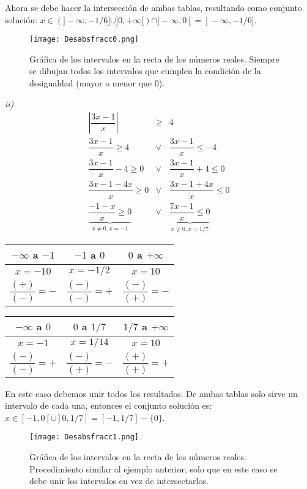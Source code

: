 Ahora se debe hacer la intersección de ambas tablas, resultando como conjunto solución: $x\in \left( ]-\infty,-1/6]\cup ]0,+\infty[\right) \cap ]-\infty,0[=]-\infty,-1/6]$.\\
\begin{center}
\begin{figure}[h!]
\centering
\texttt{[image: Desabsfracc0.png]}
\caption[Gráfica de los intervalos en la recta de los números reales.]{Gráfica de los intervalos en la recta de los números reales. Siempre se dibujan todos los  intervalos que cumplen la condición de la desigualdad (mayor o menor que 0).}
\end{figure}
\end{center}
\noindent\textit{ii)}\\
\begin{eqnarray*}
\left|\dfrac{3x-1}{x}\right| &\geq &4  \\
\dfrac{3x-1}{x}\geq 4 &\vee & \dfrac{3x-1}{x}\leq -4\\
\dfrac{3x-1}{x}-4\geq 0 &\vee & \dfrac{3x-1}{x}+4\leq 0\\
\dfrac{3x-1-4x}{x}\geq 0 &\vee & \dfrac{3x-1+4x}{x}\leq 0\\
\underbrace{\dfrac{-1-x}{x}\geq 0}_{x\neq 0, x=-1} &\vee & \underbrace{\dfrac{7x-1}{x}\leq 0}_{x\neq 0, x=1/7}
\end{eqnarray*}

\begin{minipage}{0.5\textwidth}
\begin{tabular}{|c|c|c|}
\hline
  $-\infty$ a $-1$ & $-1$ a $0$ & $0$ a $+\infty$ \\
\hline
 $x=-10$ & $x=-1/2$ & $x=10$  \\
  $\dfrac{(+)}{(-)}=-$&$\dfrac{(-)}{(-)}=+$&$\dfrac{(-)}{(+)}=-$\\
\hline
\end{tabular}
\end{minipage}
\begin{minipage}{0.5\textwidth}
\begin{tabular}{|c|c|c|}
\hline
 $-\infty$ a $0$ & $0$ a $1/7$& $1/7$ a $+\infty$    \\
\hline
 $x=-1$&$x=1/14$&$x=10$   \\
  $\dfrac{(-)}{(-)}=+$& $\dfrac{(-)}{(+)}=-$& $\dfrac{(+)}{(+)}=+$ \\
  \hline
\end{tabular}
\end{minipage}

En este caso debemos unir todos los resultados. De ambas tablas solo sirve un intervalo de cada una, entonces el conjunto solución es: $x\in [-1,0[\cup ]0,1/7]=[-1,1/7]-\{0\}$.


\begin{figure}[hbt!]
\centering
\texttt{[image: Desabsfracc1.png]}
\caption[Gráfica de los intervalos en la recta de los números reales.]{Gráfica de los intervalos en la recta de los números reales. Procedimiento similar al ejemplo anterior, solo que en este caso se debe unir los intervalos en vez de intersectarlos.}
\end{figure}
